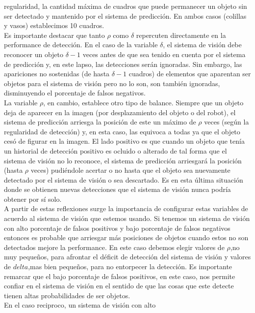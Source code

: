 regularidad, la cantidad máxima de cuadros que puede permanecer un 
objeto sin ser detectado y mantenido por el sistema de predicción. En 
ambos casos (colillas y vasos) establecimos 10 cuadros.\\ 
\indent Es importante destacar que tanto $\rho$ como $\delta$ repercuten directamente en la 
performance de detección. En el caso de la variable $\delta$, el 
sistema de visión debe reconocer un objeto $\delta -1$ veces antes de que sea 
tenido en cuenta por el sistema de predicción y, en este lapso, las 
detecciones serán ignoradas. Sin embargo, las apariciones no sostenidas 
(de hasta $\delta -1$ cuadros) de elementos que aparentan ser objetos 
para el sistema de visión pero no lo son, son también ignoradas, 
disminuyendo el porcentaje de falsos negativos.\\
\indent La variable $\rho$, en cambio, establece otro tipo de balance. 
	Siempre que un objeto deja de aparecer en la imagen (por 
	desplazamiento del objeto o del robot), el sistema de 
	predicción arriesga la posición de este un máximo de $\rho$ veces 
	(según la regularidad de detección) y, en esta caso, las equivoca a 
	todas ya que el objeto cesó de figurar en la imagen. El lado 
	positivo es que cuando un objeto que tenía un historial de 
	detección positivo es ocluido o alterado de tal forma que el 
	sistema de visión no lo reconoce, el sistema de predicción 
	arriesgará la posición (hasta $\rho$ veces) pudiéndole acertar o no hasta que el objeto 
	sea nuevamente detectado por el sistema de visión o sea descartado. 
	Es en esta última situación donde se obtienen nuevas detecciones que el sistema de visión 
	nunca podría obtener por sí solo.\\
	\indent A partir de estas reflexiones surge la importancia de configurar 
	estas variables de acuerdo al sistema de visión que estemos 
	usando. Si tenemos un sistema de visión con alto porcentaje de 
	falsos positivos y bajo porcentaje de falsos negativos entonces es 
	probable que arriesgar más posiciones de objetos cuando estos no 
	son detectados mejore la performance. En este caso debemos elegir 
	valores de $\rho$,no muy pequeños, para afrontar el déficit de 
	detección del sistema de visión  y valores de $delta$,mas bien 
	pequeños, para no entorpecer la detección. Es importante remarcar 
	que el bajo porcentaje de falsos positivos, en este caso, nos 
	permite confiar en el sistema de visión en el sentido de que las cosas que 
	este detecte tienen altas probabilidades de ser objetos. \\
	\indent En el caso reciproco, un sistema de visión con alto 
